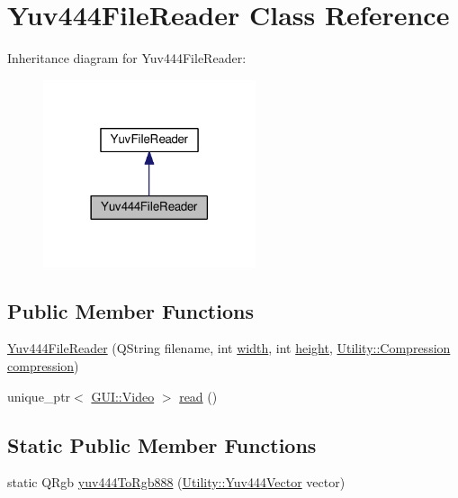 \hypertarget{classUtility_1_1Yuv444FileReader}{}\section{Yuv444\+File\+Reader Class Reference}
\label{classUtility_1_1Yuv444FileReader}


Inheritance diagram for Yuv444\+File\+Reader\+:
\nopagebreak
\begin{figure}[H]
\begin{center}
\leavevmode
\includegraphics[width=177pt]{classUtility_1_1Yuv444FileReader__inherit__graph}
\end{center}
\end{figure}
\subsection*{Public Member Functions}
\begin{DoxyCompactItemize}
\item 
\hyperlink{classUtility_1_1Yuv444FileReader_ac46c1b5839e838d4a3ac247434d32876}{Yuv444\+File\+Reader} (Q\+String filename, int \hyperlink{classUtility_1_1YuvFileReader_a2474a5474cbff19523a51eb1de01cda4}{width}, int \hyperlink{classUtility_1_1YuvFileReader_ad12fc34ce789bce6c8a05d8a17138534}{height}, \hyperlink{namespaceUtility_a56a83bf6847f4801f4205eb4be237ccf}{Utility\+::\+Compression} \hyperlink{classUtility_1_1Yuv444FileReader_aa484ffcb0c9f4d4dea91c6fae73f1fda}{compression})
\item 
unique\+\_\+ptr$<$ \hyperlink{classGUI_1_1Video}{G\+U\+I\+::\+Video} $>$ \hyperlink{classUtility_1_1Yuv444FileReader_ac6e45d1a396bdb81c8c8174bf5cc41c6}{read} ()
\end{DoxyCompactItemize}
\subsection*{Static Public Member Functions}
\begin{DoxyCompactItemize}
\item 
static Q\+Rgb \hyperlink{classUtility_1_1Yuv444FileReader_a29eb09c0726c18a7a91c90ac5e92a1cb}{yuv444\+To\+Rgb888} (\hyperlink{classUtility_1_1Yuv444Vector}{Utility\+::\+Yuv444\+Vector} vector)
\end{DoxyCompactItemize}
